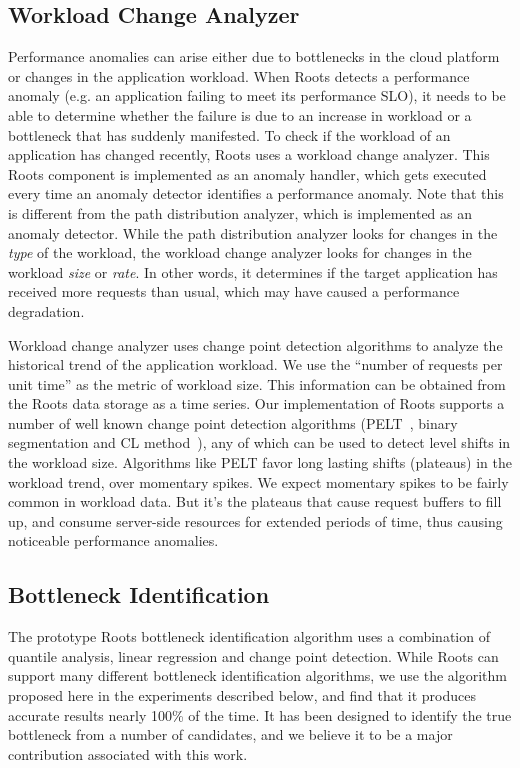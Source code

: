 \subsection{Workload Change Analyzer}

Performance anomalies can arise either due to bottlenecks in the cloud platform or 
changes in the application workload.
When Roots detects a performance anomaly (e.g. an application failing to meet its performance SLO),
it needs to be able to determine whether the failure is due
to an increase in workload or a bottleneck that has suddenly manifested.
To check if the workload of an application has changed recently, Roots uses a workload change analyzer.
This Roots component  is implemented as an anomaly handler, which gets executed every time an 
anomaly detector
identifies a performance anomaly. Note that this is different from the path distribution analyzer,
which is implemented as an anomaly detector. While the path distribution analyzer looks for changes in the
\textit{type} of the workload, the workload change analyzer looks for changes
in the workload \textit{size} or \textit{rate}. 
In other words, it determines if the target application has received more requests than usual, which
may have caused a performance degradation.

Workload change analyzer uses change point detection algorithms to analyze the historical trend of 
the application workload. We use the ``number of requests
per unit time'' as the metric of workload size. This information can be obtained from the Roots
data storage as a time series. Our implementation of Roots supports a number of well known change point
detection algorithms (PELT~\cite{doi:10.1080/01621459.2012.737745}, binary segmentation 
and CL method~\cite{chen1993joint}), any of which can be used to detect level shifts in the
workload size. Algorithms like PELT favor long lasting shifts (plateaus) in the workload trend, over momentary spikes.
We expect momentary spikes to be fairly common in workload data. But it's the plateaus that cause
request buffers to fill up, and consume server-side resources for extended periods of time, thus
causing noticeable performance anomalies.

\subsection{Bottleneck Identification}
The prototype Roots bottleneck identification algorithm uses a combination
of quantile analysis, linear regression and change point detection. While Roots can
support many different bottleneck identification algorithms, we use
the algorithm proposed here in the experiments described below, and 
find that it produces accurate results nearly 100\% of the time. It has been 
designed to identify the true bottleneck from a number of candidates, and 
we believe it to be a major contribution associated with this work.

